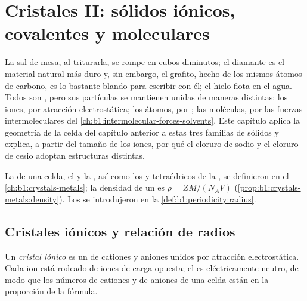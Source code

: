 \chapter{Cristales II: sólidos iónicos, covalentes y moleculares}\label{ch:b1:crystals-ionic-covalent}

La sal de mesa, al triturarla, se rompe en cubos diminutos; el diamante
es el material natural más duro y, sin embargo, el grafito, hecho de los
mismos átomos de carbono, es lo bastante blando para escribir con él; el
hielo flota en el agua. Todos son , pero sus partículas se
mantienen unidas de maneras distintas: los iones, por atracción
electrostática; los átomos, por ; las moléculas, por las
fuerzas intermoleculares del \cref{ch:b1:intermolecular-forces-solvents}.
Este capítulo aplica la geometría de la celda del capítulo anterior a
estas tres familias de sólidos y explica, a partir del tamaño de los
iones, por qué el cloruro de sodio y el cloruro de cesio adoptan
estructuras distintas.

\begin{recall}
La  de una celda, el  y la ,
así como los  y tetraédricos de la  , se definieron en el \cref{ch:b1:crystals-metals}; la
densidad de un  es $\rho = ZM/(N_A V)$
(\cref{prop:b1:crystals-metals:density}). Los  se
introdujeron en la \cref{def:b1:periodicity:radius}.
\end{recall}

\section{Cristales iónicos y relación de radios}

\begin{definition}\label{def:b1:crystals-ionic-covalent:ionic-crystal}
Un \emph{cristal iónico} es un  de cationes y
aniones unidos por atracción electrostática. Cada ion está rodeado de
iones de carga opuesta; el  es eléctricamente neutro, de modo que
los números de cationes y de aniones de una celda están en la proporción
de la fórmula.
\end{definition}

